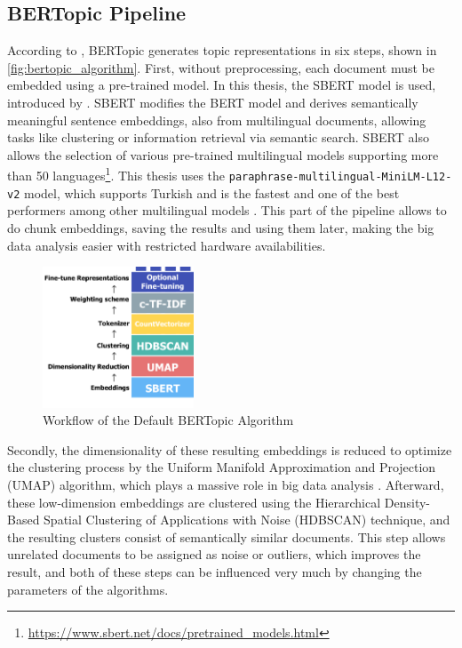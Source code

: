 \subsection{BERTopic Pipeline}\label{chapter:bertopic_pipeline}

According to \textcite{bertopic}, BERTopic generates topic representations in six steps,
shown in \autoref{fig:bertopic_algorithm}. 
First, without preprocessing, each document must be embedded using a pre-trained model. 
In this thesis, the SBERT model is used, introduced by \textcite{sentence-bert}. 
SBERT modifies the BERT model and derives semantically meaningful sentence embeddings, 
also from multilingual documents, allowing tasks like clustering or information retrieval 
via semantic search. SBERT also allows the selection of various pre-trained multilingual 
models supporting more than 50 languages\footnote{\url{https://www.sbert.net/docs/pretrained_models.html}}. 
This thesis uses the \texttt{paraphrase-multilingual-MiniLM-L12-v2} model, which supports 
Turkish and is the fastest and one of the best performers among other multilingual models 
\parencite{reimers_sbert_multilingual_2020}. This part of the pipeline allows to do 
chunk embeddings, saving the results and using them later, making the big data analysis 
easier with restricted hardware availabilities.

\begin{figure}
    \centering
    \includegraphics[width=0.4\textwidth]{figures/bertopic_algorithm.png}
    \caption[Workflow of the Default BERTopic Algorithm]
    {Workflow of the Default BERTopic Algorithm\footnotemark}\label{fig:bertopic_algorithm}
\end{figure}

Secondly, the dimensionality of these resulting embeddings is reduced to optimize the 
clustering process by the Uniform Manifold Approximation and Projection (UMAP) algorithm, 
which plays a massive role in big data analysis \parencite{mcinnes_umap_2020}. 
Afterward, these low-dimension embeddings are clustered using the Hierarchical Density-Based 
Spatial Clustering of Applications with Noise (HDBSCAN) technique, and the resulting 
clusters consist of semantically similar documents. This step allows unrelated documents 
to be assigned as noise or outliers, which improves the result, and both of these 
steps can be influenced very much by changing the parameters of the algorithms.

